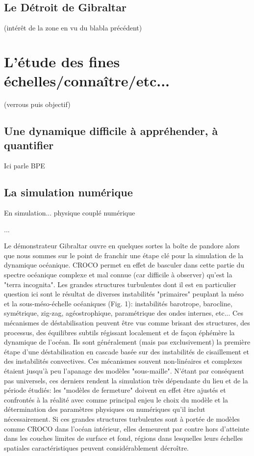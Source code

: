 \subsection{Le Détroit de Gibraltar}
(intérêt de la zone en vu du blabla précédent)



\section{L'étude des fines échelles/connaître/etc...}
(verrous puis objectif)
\subsection{Une dynamique difficile à appréhender, à quantifier}
Ici parle BPE

\subsection{La simulation numérique}
En simulation... physique couplé numérique

...

Le démonstrateur Gibraltar ouvre en quelques sortes la boîte de pandore alors que nous sommes sur le point de franchir une étape clé pour la simulation de la dynamique océanique. CROCO permet en effet de basculer dans cette partie du spectre océanique complexe et mal connue (car difficile à observer) qu'est la "terra incognita". Les grandes structures turbulentes dont il est en particulier question ici sont le résultat de diverses instabilités "primaires" peuplant la méso et la sous-méso-échelle océaniques (Fig. 1): instabilités barotrope, barocline, symétrique, zig-zag, agéostrophique, paramétrique des ondes internes, etc... Ces mécanismes de déstabilisation peuvent être vus comme brisant des structures, des processus, des équilibres subtils régissant localement et de façon éphémère la dynamique de l'océan. Ils sont généralement (mais pas exclusivement) la première étape d'une déstabilisation en cascade basée sur des instabilités de cisaillement et des instabilités convectives. Ces mécanismes souvent non-linéaires et complexes étaient jusqu'à peu l'apanage des modèles "sous-maille". N'étant par conséquent pas universels, ces derniers rendent la simulation très dépendante du lieu et de la période étudiés: les "modèles de fermeture" doivent en effet être ajustés et confrontés à la réalité avec comme principal enjeu le choix du modèle et la détermination des paramètres physiques ou numériques qu’il inclut nécessairement. Si ces grandes structures turbulentes sont à portée de modèles comme CROCO dans l’océan intérieur, elles demeurent par contre hors d’atteinte dans les couches limites de surface et fond, régions dans lesquelles leurs échelles spatiales caractéristiques peuvent considérablement décroître.

